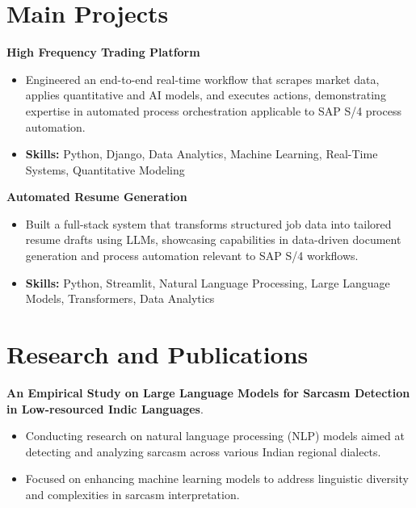 \documentclass[a4paper,11pt]{article}
\begin{document}
\section{\textbf{Main Projects}}

\vspace{1mm}
  \textbf{High Frequency Trading Platform  }
\vspace{-1.5mm} %
\begin{itemize}
  \item Engineered an end-to-end real-time workflow that scrapes market data, applies quantitative and AI models, and executes actions, demonstrating expertise in automated process orchestration applicable to SAP S/4 process automation.
\vspace{-3mm}
  \item \textbf{Skills:} Python, Django, Data Analytics, Machine Learning, Real-Time Systems, Quantitative Modeling
\end{itemize}


\vspace{1mm}
   \textbf{Automated Resume Generation }
\vspace{-1.5mm} %
\begin{itemize}
  \item Built a full-stack system that transforms structured job data into tailored resume drafts using LLMs, showcasing capabilities in data-driven document generation and process automation relevant to SAP S/4 workflows.
\vspace{-3mm}
  \item \textbf{Skills:} Python, Streamlit, Natural Language Processing, Large Language Models, Transformers, Data Analytics
\end{itemize}



\section{\textbf{Research and Publications} \hfill }
\vspace{1mm}
  \textbf{An Empirical Study on Large Language Models for Sarcasm Detection in Low-resourced Indic Languages}.
\vspace{-1mm} %
\begin{itemize}
  \item Conducting research on natural language processing (NLP) models aimed at detecting and analyzing sarcasm across various Indian regional dialects.
\vspace{-3mm}
  \item Focused on enhancing machine learning models to address linguistic diversity and complexities in sarcasm interpretation.
\end{itemize}
\end{document}
